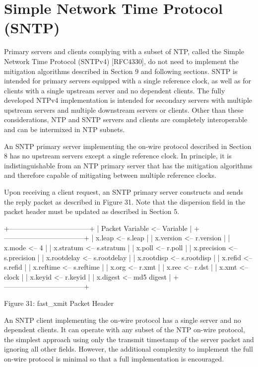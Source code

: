 \chapter{Simple Network Time Protocol (SNTP)}

Primary servers and clients complying with a subset of NTP, called
the Simple Network Time Protocol (SNTPv4) [RFC4330], do not need to
implement the mitigation algorithms described in Section 9 and
following sections.  SNTP is intended for primary servers equipped
with a single reference clock, as well as for clients with a single
upstream server and no dependent clients.  The fully developed NTPv4
implementation is intended for secondary servers with multiple
upstream servers and multiple downstream servers or clients.  Other
than these considerations, NTP and SNTP servers and clients are
completely interoperable and can be intermixed in NTP subnets.

An SNTP primary server implementing the on-wire protocol described in
Section 8 has no upstream servers except a single reference clock.
In principle, it is indistinguishable from an NTP primary server that
has the mitigation algorithms and therefore capable of mitigating
between multiple reference clocks.

Upon receiving a client request, an SNTP primary server constructs
and sends the reply packet as described in Figure 31.  Note that the
dispersion field in the packet header must be updated as described in
Section 5.

                +-----------------------------------+
                | Packet Variable <--   Variable    |
                +-----------------------------------+
                | x.leap        <--     s.leap      |
                | x.version     <--     r.version   |
                | x.mode        <--     4           |
                | x.stratum     <--     s.stratum   |
                | x.poll        <--     r.poll      |
                | x.precision   <--     s.precision |
                | x.rootdelay   <--     s.rootdelay |
                | x.rootdisp    <--     s.rootdisp  |
                | x.refid       <--     s.refid     |
                | x.reftime     <--     s.reftime   |
                | x.org         <--     r.xmt       |
                | x.rec         <--     r.dst       |
                | x.xmt         <--     clock       |
                | x.keyid       <--     r.keyid     |
                | x.digest      <--     md5 digest  |
                +-----------------------------------+

                Figure 31: fast_xmit Packet Header

An SNTP client implementing the on-wire protocol has a single server
and no dependent clients.  It can operate with any subset of the NTP
on-wire protocol, the simplest approach using only the transmit
timestamp of the server packet and ignoring all other fields.
However, the additional complexity to implement the full on-wire
protocol is minimal so that a full implementation is encouraged.
